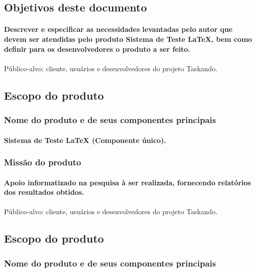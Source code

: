 	\subsection{Objetivos deste documento}
		\paragraph{Descrever e especificar as necessidades levantadas pelo autor que devem ser atendidas pelo produto Sistema de Teste LaTeX, bem como definir para os desenvolvedores o produto a ser feito.}

\paragraph{}Público-alvo: cliente, usuários e desenvolvedores do projeto Taskando.
	\subsection{Escopo do produto}
		\subsubsection{Nome do produto e de seus componentes principais}
			\paragraph{Sistema de Teste LaTeX (Componente único). }
		\subsubsection{Missão do produto}
			\paragraph{Apoio informatizado na pesquisa à ser realizada, fornecendo relatórios dos resultados obtidos.}
			
\paragraph{}Público-alvo: cliente, usuários e desenvolvedores do projeto Taskando.
	\subsection{Escopo do produto}
		\subsubsection{Nome do produto e de seus componentes principais}
